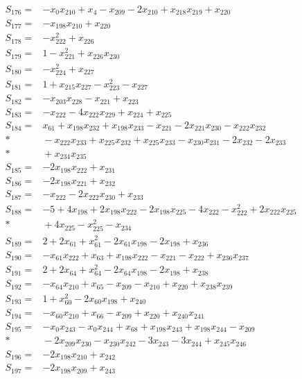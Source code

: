 \begin{align*}
S_{176}={}&-x_{0}x_{210}+x_{4}-x_{209}-2x_{210}+x_{218}x_{219}+x_{220}\\[3pt]
S_{177}={}&-x_{198}x_{210}+x_{220}\\[3pt]
S_{178}={}&-x_{222}^{2}+x_{226}\\[3pt]
S_{179}={}&1-x_{221}^{2}+x_{226}x_{230}\\[3pt]
S_{180}={}&-x_{224}^{2}+x_{227}\\[3pt]
S_{181}={}&1+x_{215}x_{227}-x_{223}^{2}-x_{227}\\[3pt]
S_{182}={}&-x_{203}x_{228}-x_{221}+x_{223}\\[3pt]
S_{183}={}&-x_{222}-4x_{222}x_{229}+x_{224}+x_{225}\\[3pt]
S_{184}={}&x_{61}+x_{198}x_{232}+x_{198}x_{233}-x_{221}-2x_{221}x_{230}-x_{222}x_{232}\\*
&{}-x_{222}x_{233}+x_{225}x_{232}+x_{225}x_{233}-x_{230}x_{231}-2x_{232}-2x_{233}\\*
&{}+x_{234}x_{235}\\[3pt]
S_{185}={}&-2x_{198}x_{222}+x_{231}\\[3pt]
S_{186}={}&-2x_{198}x_{221}+x_{232}\\[3pt]
S_{187}={}&-x_{222}-2x_{222}x_{230}+x_{233}\\[3pt]
S_{188}={}&-5+4x_{198}+2x_{198}x_{222}-2x_{198}x_{225}-4x_{222}-x_{222}^{2}+2x_{222}x_{225}\\*
&{}+4x_{225}-x_{225}^{2}-x_{234}\\[3pt]
S_{189}={}&2+2x_{61}+x_{61}^{2}-2x_{61}x_{198}-2x_{198}+x_{236}\\[3pt]
S_{190}={}&-x_{61}x_{222}+x_{63}+x_{198}x_{222}-x_{221}-x_{222}+x_{236}x_{237}\\[3pt]
S_{191}={}&2+2x_{64}+x_{64}^{2}-2x_{64}x_{198}-2x_{198}+x_{238}\\[3pt]
S_{192}={}&-x_{64}x_{210}+x_{65}-x_{209}-x_{210}+x_{220}+x_{238}x_{239}\\[3pt]
S_{193}={}&1+x_{60}^{2}-2x_{60}x_{198}+x_{240}\\[3pt]
S_{194}={}&-x_{60}x_{210}+x_{66}-x_{209}+x_{220}+x_{240}x_{241}\\[3pt]
S_{195}={}&-x_{0}x_{243}-x_{0}x_{244}+x_{68}+x_{198}x_{243}+x_{198}x_{244}-x_{209}\\*
&{}-2x_{209}x_{230}-x_{230}x_{242}-3x_{243}-3x_{244}+x_{245}x_{246}\\[3pt]
S_{196}={}&-2x_{198}x_{210}+x_{242}\\[3pt]
S_{197}={}&-2x_{198}x_{209}+x_{243}\\[3pt]

\end{align*}
